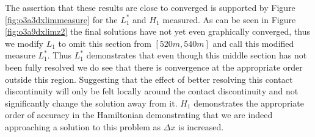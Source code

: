 \documentclass[SingleSpace,12pt,Journal]{Serre_ASCE}
\begin{document}
The assertion that these results are close to converged is supported by Figure \ref{fig:o3a3dxlimmeasure} for the $L^*_1$ and $H_1$ measured. As can be seen in Figure \ref{fig:o3a9dxlimz2} the final solutions have not yet even graphically converged, thus we modify $L_1$ to omit this section from $[520m,540m]$ and call this modified measure $L^*_1$. Thus $L^*_1$ demonstrates that even though this middle section has not been fully resolved we do see that there is convergence at the appropriate order outside this region. Suggesting that the effect of better resolving this contact discontinuity will only be felt locally around the contact discontinuity and not significantly change the solution away from it. $H_1$ demonstrates the appropriate order of accuracy in the Hamiltonian demonstrating that we are indeed approaching a solution to this problem as $\Delta x$ is increased. 
\end{document}
